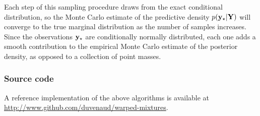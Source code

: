 Each step of this sampling procedure draws from the exact conditional distribution, so the Monte Carlo estimate of the predictive density $p({\bf{y}}_\star | \mathbf{Y})$ will converge to the true marginal distribution as the number of samples increases.
Since the observations ${\bf{y}}_\star$ are conditionally normally distributed, each one adds a smooth contribution to the empirical Monte Carlo estimate of the posterior density, as opposed to a collection of point masses.

\subsubsection{Source code}

A reference implementation of the above algorithms is available at\\ \url{http://www.github.com/duvenaud/warped-mixtures}.

\outbpdocument{


}

